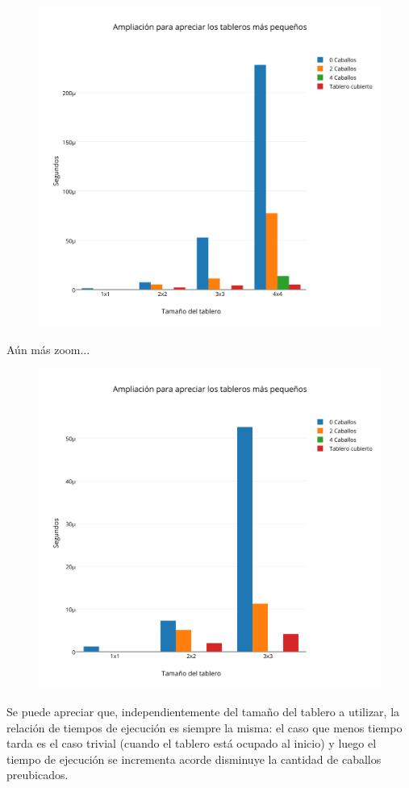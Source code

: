 \begin{figure}[h!]
   \begin{center}
\includegraphics[scale=0.173]{../src/ej3/Mediciones/Barras2.png} 
   \end{center}
 \end{figure}

Aún más zoom...

\begin{figure}[h!]
   \begin{center}
\includegraphics[scale=0.173]{../src/ej3/Mediciones/Barras3.png}
   \end{center}
 \end{figure}


 
Se puede apreciar que, independientemente del tamaño del tablero a utilizar, la relación de tiempos de ejecución es siempre la misma: el caso que menos tiempo tarda es el caso trivial (cuando el tablero está ocupado al inicio) y luego el tiempo de ejecución se incrementa acorde disminuye la cantidad de caballos preubicados.
 